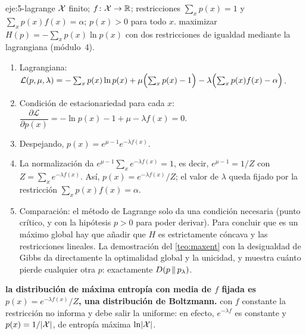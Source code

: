 \begin{solucion}{eje:5-lagrange}
\datos $\mathcal{X}$ finito; $f\colon\mathcal{X}\to\mathbb{R}$; restricciones $\sum_xp(x)=1$ y $\sum_xp(x)f(x)=\alpha$; $p(x)>0$ para todo $x$.
\planteamiento maximizar $H(p)=-\sum_xp(x)\ln p(x)$ con dos restricciones de igualdad mediante la lagrangiana (módulo~4).
\pasos
\begin{enumerate}[label=\arabic*.]
  \item Lagrangiana: $\mathcal{L}(p,\mu,\lambda)=-\sum_xp(x)\ln p(x)+\mu\Bigl(\sum_xp(x)-1\Bigr)-\lambda\Bigl(\sum_xp(x)f(x)-\alpha\Bigr)$.
  \item Condición de estacionariedad para cada $x$: $\dfrac{\partial\mathcal{L}}{\partial p(x)}=-\ln p(x)-1+\mu-\lambda f(x)=0$.
  \item Despejando, $p(x)=e^{\mu-1}e^{-\lambda f(x)}$.
  \item La normalización da $e^{\mu-1}\sum_xe^{-\lambda f(x)}=1$, es decir, $e^{\mu-1}=1/Z$ con $Z=\sum_xe^{-\lambda f(x)}$. Así, $p(x)=e^{-\lambda f(x)}/Z$; el valor de $\lambda$ queda fijado por la restricción $\sum_xp(x)f(x)=\alpha$.
  \item Comparación: el método de Lagrange solo da una condición necesaria (punto crítico, y con la hipótesis $p>0$ para poder derivar). Para concluir que es un máximo global hay que añadir que $H$ es estrictamente cóncava y las restricciones lineales. La demostración del \cref{teo:maxent} con la desigualdad de Gibbs da directamente la optimalidad global y la unicidad, y muestra cuánto pierde cualquier otra $p$: exactamente $D(p\,\|\,p_\lambda)$.
\end{enumerate}
\resultado \textbf{la distribución de máxima entropía con media de $f$ fijada es $p(x)=e^{-\lambda f(x)}/Z$, una distribución de Boltzmann.}
\comprobacion con $f$ constante la restricción no informa y debe salir la uniforme: en efecto, $e^{-\lambda f}$ es constante y $p(x)=1/\lvert\mathcal{X}\rvert$, de entropía máxima $\ln\lvert\mathcal{X}\rvert$.
\end{solucion}

